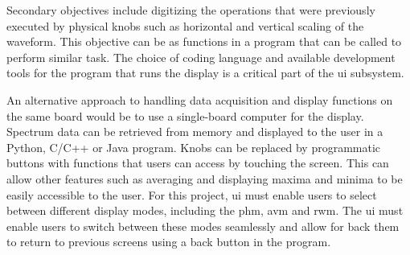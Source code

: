 \documentclass[class=report,11pt,crop=false]{standalone}
\begin{document}
	Secondary objectives include digitizing the operations that were previously executed by physical knobs such as horizontal and vertical scaling of the waveform. This objective can be  as functions in a program that can be called to perform similar task. The choice of coding language and available development tools for the program that runs the display is a critical part of the \acrshort{ui} subsystem. 
	
	An alternative approach to handling data acquisition and display functions on the same board would be to use a single-board computer for the display. Spectrum data can be retrieved from memory and displayed to the user in a Python, C/C++ or Java program. Knobs can be replaced by programmatic buttons with functions that users can access by touching the screen. This can allow other features such as averaging and displaying maxima and minima to be easily accessible to the user. For this project, \acrshort{ui} must enable users to select between different display modes, including the \acrshort{phm}, \acrshort{avm} and \acrshort{rwm}. The \acrshort{ui} must enable users to switch between these modes seamlessly and allow for back them to return to previous screens using a back button in the program.
	
\end{document}
